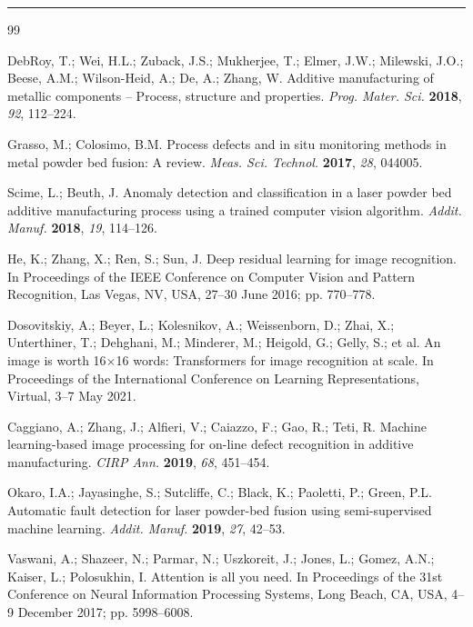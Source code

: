 \vspace{6pt}
\noindent\rule{\linewidth}{0.4pt}

\begin{thebibliography}{99}
\small

DebRoy, T.; Wei, H.L.; Zuback, J.S.; Mukherjee, T.; Elmer, J.W.; Milewski, J.O.; Beese, A.M.; Wilson-Heid, A.; De, A.; Zhang, W.
Additive manufacturing of metallic components -- Process, structure and properties.
\textit{Prog. Mater. Sci.} \textbf{2018}, \textit{92}, 112--224.

Grasso, M.; Colosimo, B.M.
Process defects and in situ monitoring methods in metal powder bed fusion: A review.
\textit{Meas. Sci. Technol.} \textbf{2017}, \textit{28}, 044005.

Scime, L.; Beuth, J.
Anomaly detection and classification in a laser powder bed additive manufacturing process using a trained computer vision algorithm.
\textit{Addit. Manuf.} \textbf{2018}, \textit{19}, 114--126.

He, K.; Zhang, X.; Ren, S.; Sun, J.
Deep residual learning for image recognition.
In Proceedings of the IEEE Conference on Computer Vision and Pattern Recognition, Las Vegas, NV, USA, 27--30 June 2016; pp. 770--778.

Dosovitskiy, A.; Beyer, L.; Kolesnikov, A.; Weissenborn, D.; Zhai, X.; Unterthiner, T.; Dehghani, M.; Minderer, M.; Heigold, G.; Gelly, S.; et al.
An image is worth 16$\times$16 words: Transformers for image recognition at scale.
In Proceedings of the International Conference on Learning Representations, Virtual, 3--7 May 2021.

Caggiano, A.; Zhang, J.; Alfieri, V.; Caiazzo, F.; Gao, R.; Teti, R.
Machine learning-based image processing for on-line defect recognition in additive manufacturing.
\textit{CIRP Ann.} \textbf{2019}, \textit{68}, 451--454.

Okaro, I.A.; Jayasinghe, S.; Sutcliffe, C.; Black, K.; Paoletti, P.; Green, P.L.
Automatic fault detection for laser powder-bed fusion using semi-supervised machine learning.
\textit{Addit. Manuf.} \textbf{2019}, \textit{27}, 42--53.

Vaswani, A.; Shazeer, N.; Parmar, N.; Uszkoreit, J.; Jones, L.; Gomez, A.N.; Kaiser, L.; Polosukhin, I.
Attention is all you need.
In Proceedings of the 31st Conference on Neural Information Processing Systems, Long Beach, CA, USA, 4--9 December 2017; pp. 5998--6008.


\end{thebibliography}
